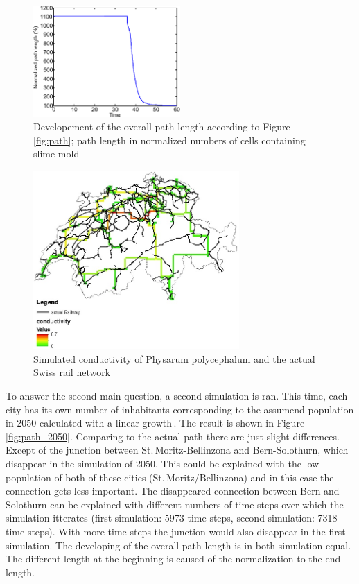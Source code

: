 \documentclass[11pt]{scrartcl}
\begin{document}
\begin{figure}[H]
	\centering
	\includegraphics[width=0.5\textwidth]{figures/plottrail1}
	\caption{Developement of the overall path length according to Figure\,\ref{fig:path}; path length in normalized numbers of cells containing slime mold}
	\label{fig:plottrail}
\end{figure}

\begin{figure}[H]
	\centering
	\includegraphics[width=0.7\textwidth]{figures/conductivity_railway}
	\caption{Simulated conductivity of Physarum polycephalum and the actual Swiss rail network}
	\label{fig:conductivity}
\end{figure}

To answer the second main question, a second simulation is ran. This time, each city has its own number of inhabitants corresponding to the assumend population in 2050 calculated with a linear growth\,\cite{bfs}. The result is shown in Figure\,\ref{fig:path_2050}. Comparing to the actual path there are just slight differences. Except of the junction between St.\,Moritz-Bellinzona and Bern-Solothurn, which disappear in the simulation of 2050. This could be explained with the low population of both of these cities (St.\,Moritz/Bellinzona) and in this case the connection gets less important. The disappeared connection between Bern and Solothurn can be explained with different numbers of time steps over which the simulation itterates (first simulation: 5973 time steps, second simulation: 7318 time steps). With more time steps the junction would also disappear in the first simulation. The developing of the overall path length is in both simulation equal. The different length at the beginning is caused of the normalization to the end length.
\end{document}

